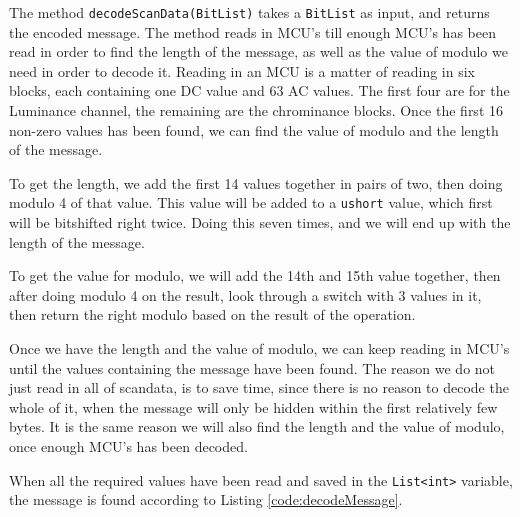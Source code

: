 The method \lstinline|decodeScanData(BitList)| takes a \lstinline|BitList| as input, and returns the encoded message.
The method reads in MCU's till enough MCU's has been read in order to find the length of the message, as well as the value of modulo we need in order to decode it.
Reading in an MCU is a matter of reading in six blocks, each containing one DC value and 63 AC values. The first four are for the Luminance channel, the remaining are the chrominance blocks.
Once the first 16 non-zero values has been found, we can find the value of modulo and the length of the message.

To get the length, we add the first 14 values together in pairs of two, then doing modulo 4 of that value. 
This value will be added to a \lstinline|ushort| value, which first will be bitshifted right twice. 
Doing this seven times, and we will end up with the length of the message.

To get the value for modulo, we will add the 14th and 15th value together, then after doing modulo 4 on the result, look through a switch with 3 values in it, then return the right modulo based on the result of the operation.

Once we have the length and the value of modulo, we can keep reading in MCU's until the values containing the message have been found. 
The reason we do not just read in all of scandata, is to save time, since there is no reason to decode the whole of it, when the message will only be hidden within the first relatively few bytes.
It is the same reason we will also find the length and the value of modulo, once enough MCU's has been decoded.

When all the required values have been read and saved in the \lstinline|List<int>| variable, the message is found according to Listing \ref{code:decodeMessage}.

